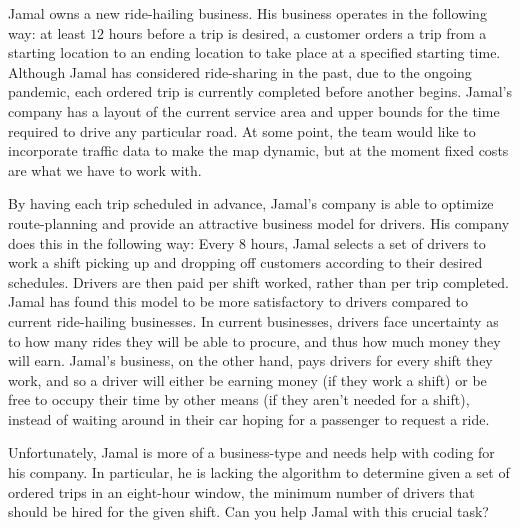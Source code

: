 \documentclass[11pt,letterpaper]{article}
\title{}
\author{}
\date{\today}
\begin{document}
\maketitle

Jamal owns a new ride-hailing business. His business operates in the following way: at least $12$ hours before a trip is desired, a customer orders a trip from a starting location to an ending location to take place at a specified starting time. Although Jamal has considered ride-sharing in the past, due to the ongoing pandemic, each ordered trip is currently completed before another begins. Jamal’s company has a layout of the current service area and upper bounds for the time required to drive any particular road. At some point, the team would like to incorporate traffic data to make the map dynamic, but at the moment fixed costs are what we have to work with.

By having each trip scheduled in advance, Jamal’s company is able to optimize route-planning and provide an attractive business model for drivers. His company does this in the following way: Every $8$ hours, Jamal selects a set of drivers to work a shift picking up and dropping off customers according to their desired schedules. Drivers are then paid per shift worked, rather than per trip completed. Jamal has found this model to be more satisfactory to drivers compared to current ride-hailing businesses. In current businesses, drivers face uncertainty as to how many rides they will be able to procure, and thus how much money they will earn. Jamal’s business, on the other hand, pays drivers for every shift they work, and so a driver will either be earning money (if they work a shift) or be free to occupy their time by other means (if they aren’t needed for a shift), instead of waiting around in their car hoping for a passenger to request a ride.

Unfortunately, Jamal is more of a business-type and needs help with coding for his company. In particular, he is lacking the algorithm to determine given a set of ordered trips in an eight-hour window, the minimum number of drivers that should be hired for the given shift. Can you help Jamal with this crucial task?
\end{document}
